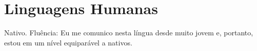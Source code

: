 \section{Linguagens Humanas}
{Nativo.}
{Fluência: Eu me comunico nesta língua desde muito jovem e, portanto, estou em um nível equiparável a nativos.}
